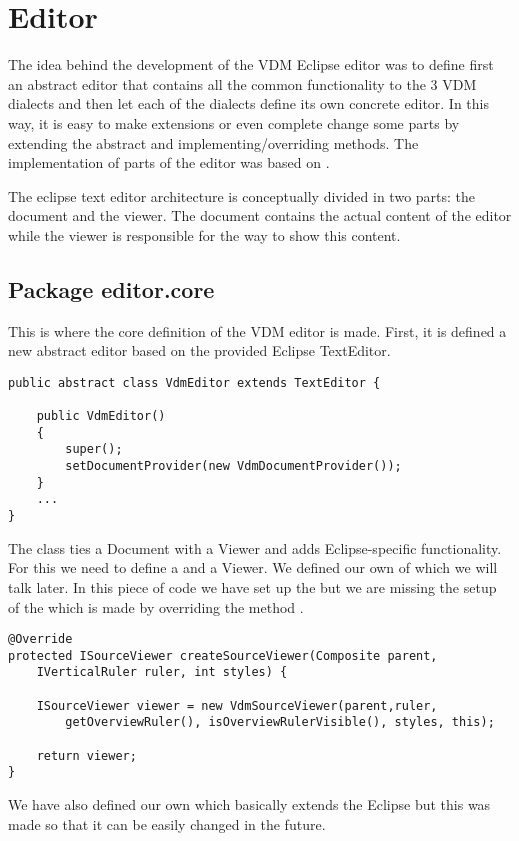 \section{Editor}
The idea behind the development of the VDM Eclipse editor was to define first an abstract editor that contains all the common functionality to the 3 VDM dialects and then let each of the dialects define its own concrete editor. In this way, it is easy to make extensions or even complete change some parts by extending the abstract and implementing/overriding methods. The implementation of parts of the editor was based on \cite{Deva06}.

The eclipse text editor architecture is conceptually divided in two parts: the document and the viewer. The document contains the actual content of the editor while the viewer is responsible for the way to show this content. 

\subsection{Package editor.core}
This is where the core definition of the VDM editor is made. First, it is defined a new abstract editor based on the provided Eclipse TextEditor.

\begin{lstlisting}
public abstract class VdmEditor extends TextEditor {

	public VdmEditor()
	{
		super();
		setDocumentProvider(new VdmDocumentProvider());
	}
	...
}
\end{lstlisting}
The  class ties a Document with a Viewer and adds Eclipse-specific functionality. For this we need to define a  and a Viewer. We defined our own  of which we will talk later. In this piece of code we have set up the  but we are missing the setup of the  which is made by overriding the method .

\begin{lstlisting}
@Override
protected ISourceViewer createSourceViewer(Composite parent,
	IVerticalRuler ruler, int styles) {
	
	ISourceViewer viewer = new VdmSourceViewer(parent,ruler, 
		getOverviewRuler(), isOverviewRulerVisible(), styles, this);
		
	return viewer;		
}
\end{lstlisting}
We have also defined our own  which basically extends the Eclipse  but this was made so that it can be easily changed in the future.

